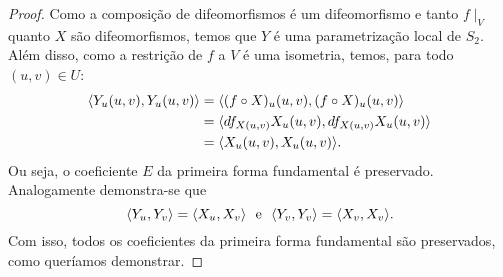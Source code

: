 \begin{proof}
    Como a composição de difeomorfismos é um difeomorfismo e tanto \( f \mid_{ V } \) quanto \( X \) são difeomorfismos, temos que \( Y \) é uma parametrização local de \( S_{ 2 } \).
    Além disso, como a restrição de \( f \) a \( V \) é uma isometria, temos, para todo \( ( u, v ) \in U \):
    \begin{align*}
        \langle Y_{ u } ( u, v ), Y_{ u } ( u, v ) \rangle
        &= \langle
            ( f \circ X )_{ u } ( u, v ),
            ( f \circ X )_{ u } ( u, v )
        \rangle \\
        &= \langle
            df_{ X ( u, v ) } X_{ u } ( u, v ),
            df_{ X ( u, v ) } X_{ u } ( u, v )
        \rangle \\
        &= \langle 
            X_{ u } ( u, v ), X_{ u } ( u, v )
        \rangle
    .\end{align*}
    Ou seja, o coeficiente \( E \) da primeira forma fundamental é preservado.
    Analogamente demonstra-se que
    \begin{equation*}
        \langle Y_{ u }, Y_{ v } \rangle = \langle X_{ u }, X_{ v } \rangle
        \ \text{ e } \
        \langle Y_{ v }, Y_{ v } \rangle = \langle X_{ v }, X_{ v } \rangle
    .\end{equation*}
    Com isso, todos os coeficientes da primeira forma fundamental são preservados, como queríamos demonstrar.
\end{proof}
